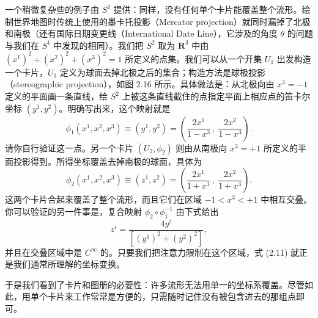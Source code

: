 一个稍微复杂些的例子由 $S^2$ 提供：同样，没有任何单个卡片能覆盖整个流形。绘制世界地图时传统上使用的墨卡托投影（Mercator projection）就同时漏掉了北极和南极（还有国际日期变更线（International Date Line），它涉及的角度 $\theta$ 的问题与我们在 $S^1$ 中发现的相同）。我们把 $S^2$ 取为 $\mathbf{R}^3$ 中由 $(x^1)^2+(x^2)^2+(x^3)^2=1$ 所定义的点集。我们可以从一个开集 $U_1$ 出发构造一个卡片，$U_1$ 定义为球面去掉北极之后的集合；构造方法是球极投影（stereographic projection），如图 2.16 所示。具体做法是：从北极向由 $x^3=-1$ 定义的平面画一条直线，给 $S^2$ 上被这条直线截住的点指定平面上相应点的笛卡尔坐标 $(y^1,y^2)$。明确写出来，这个映射就是
\begin{equation*}
\phi_1(x^1,x^2,x^3)\equiv(y^1,y^2)=\left(\frac{2x^1}{1-x^3}\,,\ \frac{2x^2}{1-x^3}\right). \tag{2.9}
\end{equation*}
请你自行验证这一点。另一个卡片 $(U_2,\phi_2)$ 则由从南极向 $x^3=+1$ 所定义的平面投影得到。所得坐标覆盖去掉南极的球面，具体为
\begin{equation*}
\phi_2(x^1,x^2,x^3)\equiv(z^1,z^2)=\left(\frac{2x^1}{1+x^3}\,,\ \frac{2x^2}{1+x^3}\right). \tag{2.10}
\end{equation*}
这两个卡片合起来覆盖了整个流形，而且它们在区域 $-1<x^3<+1$ 中相互交叠。你可以验证的另一件事是，复合映射 $\phi_2\circ\phi_1^{-1}$ 由下式给出
\begin{equation*}
z^i=\frac{4y^i}{\left[(y^1)^2+(y^2)^2\right]}, \tag{2.11}
\end{equation*}
并且在交叠区域中是 $C^\infty$ 的。只要我们把注意力限制在这个区域，式 (2.11) 就正是我们通常所理解的坐标变换。

于是我们看到了卡片和图册的必要性：许多流形无法用单一的坐标系覆盖。尽管如此，用单个卡片来工作常常是方便的，只需随时记住没有被包含进去的那组点即可。

